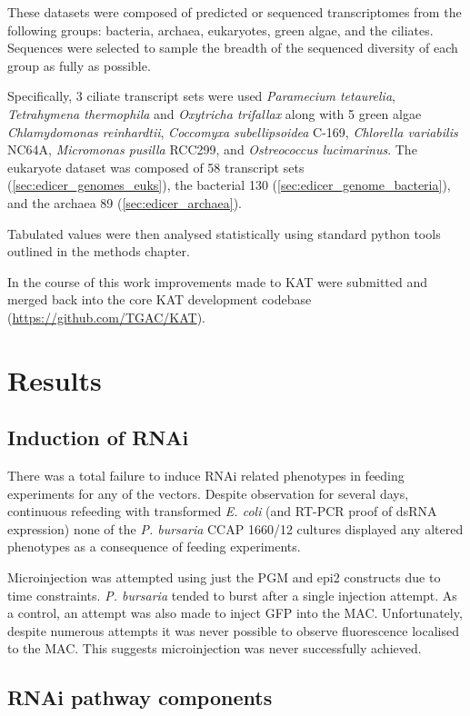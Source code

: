 These datasets were composed of predicted or sequenced transcriptomes 
from the following groups: bacteria, 
archaea, eukaryotes, green algae, and the ciliates.
Sequences were selected to sample the breadth of the sequenced
diversity of each group as fully as possible.

Specifically, 3 ciliate transcript sets were used \textit{Paramecium tetaurelia}, 
\textit{Tetrahymena thermophila} and \textit{Oxytricha trifallax} along with
5 green algae \textit{Chlamydomonas reinhardtii}, \textit{Coccomyxa subellipsoidea}
C-169, \textit{Chlorella variabilis} NC64A, \textit{Micromonas pusilla} RCC299, and
\textit{Ostreococcus lucimarinus}.
The eukaryote dataset was composed of 58 transcript
sets (\cref{sec:edicer_genomes_euks}),
the bacterial 130 (\cref{sec:edicer_genome_bacteria}), and 
the archaea 89 (\cref{sec:edicer_archaea}).

Tabulated values were then analysed statistically
using standard python tools outlined in the methods chapter.

In the course of this work improvements made to KAT were submitted and merged
back into the core KAT development codebase (\url{https://github.com/TGAC/KAT}).

\section{Results}

\subsection{Induction of RNAi}

There was a total failure to induce RNAi related phenotypes
in feeding experiments for any of the vectors. 
Despite observation for several days, continuous refeeding
with transformed \textit{E. coli} (and RT-PCR proof of dsRNA expression)
none of the \textit{P. bursaria} CCAP 1660/12 
cultures displayed any altered phenotypes as a consequence of feeding experiments. 


Microinjection was attempted using just the PGM and epi2 constructs due to
time constraints.
\textit{P. bursaria} tended to burst after a single injection attempt.
As a control, an attempt was also made to inject GFP into the MAC.
Unfortunately, despite numerous attempts it was never possible
to observe fluorescence localised to the MAC. This suggests
microinjection was never successfully achieved. 

\subsection{RNAi pathway components}

